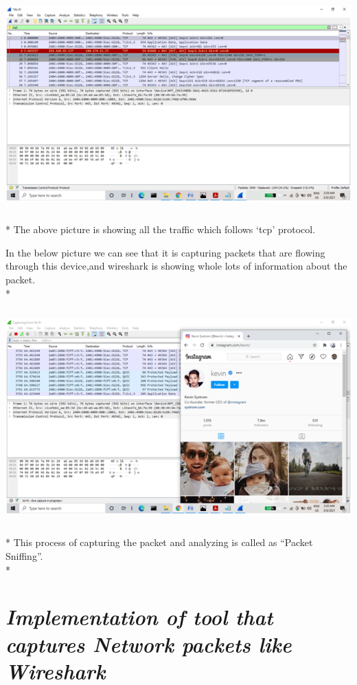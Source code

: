 \documentclass[a4paper,12pt]{report}
\begin{document}
\includegraphics[width=6.26772in,height=3.52778in]{image8.png}
\\*
The above picture is showing all the traffic which follows `tcp'
protocol.

In the below picture we can see that it is capturing packets that are
flowing through this device,and wireshark is showing whole lots of
information about the packet.
\\*
\includegraphics[width=6.26772in,height=3.52778in]{image10.png}
\\*
This process of capturing the packet and analyzing is called as ``Packet
Sniffing''.
\\*


\chapter{\emph{Implementation of tool that captures Network packets like
Wireshark} }
\end{document}
